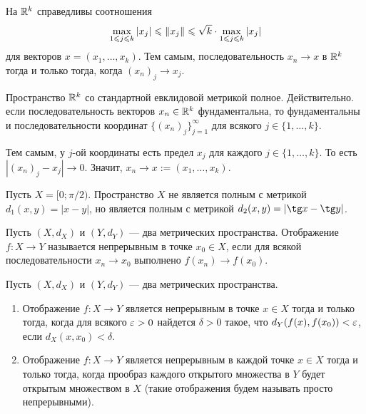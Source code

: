 \documentclass[a4paper]{article}
\theoremstyle{named}
\begin{document}
    \begin{remark*}
        На $\mathbb{R}^k$ справедливы соотношения
        \begin{equation*}
            \max\limits_{1 \leqslant j \leqslant k} |x_j| \leqslant \left\lVert x_j\right\rVert \leqslant \sqrt{k} \cdot \max\limits_{1 \leqslant j \leqslant k} |x_j|
        \end{equation*}
        для векторов $x = (x_1, \dots, x_k)$. Тем самым, последовательность $x_n \to x$ в $\mathbb{R}^k$ тогда и только тогда, когда $(x_n)_j \to x_j$.
    \end{remark*}

    \begin{example*}
        Пространство $\mathbb{R}^k$ со стандартной евклидовой метрикой полное. Действительно. если последовательность векторов $x_n \in \mathbb{R}^k$ фундаментальна, то фундаментальны и последовательности координат $\{(x_n)_j\}_{j = 1}^{\infty}$ для всякого $j \in \{1, \dots, k\}$.

        Тем самым, у $j$-ой координаты есть предел $x_j$ для каждого $j \in \{1, \dots, k\}$. То есть $|(x_n)_j - x_j| \to 0$. Значит, $x_n \to x := (x_1, \dots, x_k)$.
    \end{example*}

    \begin{example*}
        Пусть $X = [0; \pi / 2)$. Пространство $X$ не является полным с метрикой $d_1(x, y) = |x - y|$, но является полным с метрикой $d_2(x, y) = |\tg x - \tg y|$.
    \end{example*}

    \begin{definition*}
        Пусть $(X, d_X)$ и $(Y, d_Y)$ --- два метрических пространства. Отображение $f: X \to Y$ называется непрерывным в точке $x_0 \in X$, если для всякой последовательности $x_n \to x_0$ выполнено $f(x_n) \to f(x_0)$.
    \end{definition*}

    \begin{lemma*}
        Пусть $(X, d_X)$ и $(Y, d_Y)$ --- два метрических пространства.
        \begin{enumerate}
        \item
            Отображение $f: X \to Y$ является непрерывным в точке $x \in X$ тогда и только тогда, когда для всякого $\varepsilon > 0$ найдется $\delta > 0$ такое, что $d_Y(f(x), f(x_0)) < \varepsilon$, если $d_X(x, x_0) < \delta$.

        \item
            Отображение $f: X \to Y$ является непрерывным в каждой точке $x \in X$ тогда и только тогда, когда прообраз каждого открытого множества в $Y$ будет открытым множеством в $X$ (такие отображения будем называть просто непрерывными).
        \end{enumerate}
    \end{lemma*}
\end{document}
